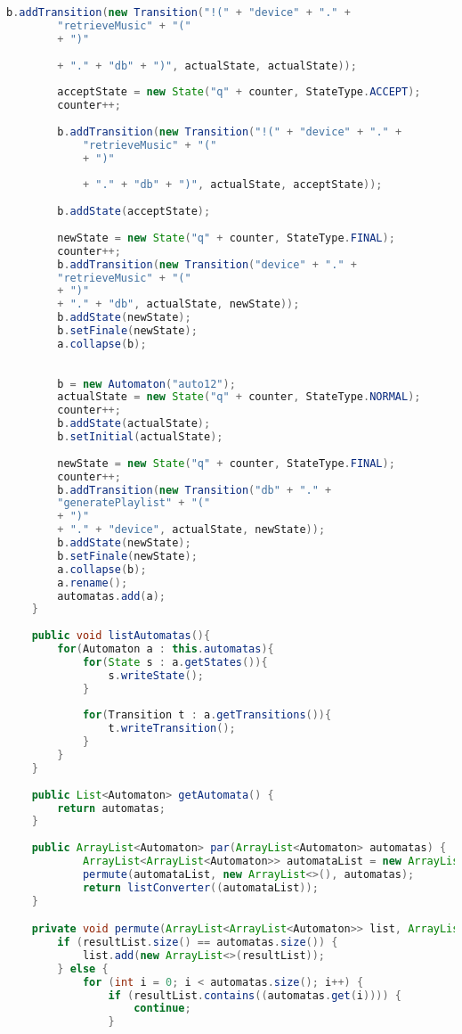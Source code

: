 \begin{lstlisting}[language=java, caption={Specification osztály.},captionpos=b]
		b.addTransition(new Transition("!(" + "device" + "." +
		"retrieveMusic" + "("
		+ ")"
		
		+ "." + "db" + ")", actualState, actualState));
		
		acceptState = new State("q" + counter, StateType.ACCEPT);
		counter++;
		
		b.addTransition(new Transition("!(" + "device" + "." +
			"retrieveMusic" + "("
			+ ")"
			
			+ "." + "db" + ")", actualState, acceptState));
		
		b.addState(acceptState);
		
		newState = new State("q" + counter, StateType.FINAL);
		counter++;
		b.addTransition(new Transition("device" + "." +
		"retrieveMusic" + "("
		+ ")"
		+ "." + "db", actualState, newState));
		b.addState(newState);
		b.setFinale(newState);
		a.collapse(b);
		
		
		b = new Automaton("auto12");
		actualState = new State("q" + counter, StateType.NORMAL);
		counter++;
		b.addState(actualState);
		b.setInitial(actualState);
												
		newState = new State("q" + counter, StateType.FINAL);
		counter++;
		b.addTransition(new Transition("db" + "." +
		"generatePlaylist" + "("
		+ ")"
		+ "." + "device", actualState, newState));
		b.addState(newState);
		b.setFinale(newState);
		a.collapse(b);
		a.rename();
		automatas.add(a);
	}
	
	public void listAutomatas(){
		for(Automaton a : this.automatas){
			for(State s : a.getStates()){
				s.writeState();	
			}
			
			for(Transition t : a.getTransitions()){
				t.writeTransition();
			}
		}
	}
	
	public List<Automaton> getAutomata() {
		return automatas;
	}
	
	public ArrayList<Automaton> par(ArrayList<Automaton> automatas) {
	        ArrayList<ArrayList<Automaton>> automataList = new ArrayList<>();
	        permute(automataList, new ArrayList<>(), automatas);
	        return listConverter((automataList));
	}

    private void permute(ArrayList<ArrayList<Automaton>> list, ArrayList<Automaton> resultList, ArrayList<Automaton> automatas) {
        if (resultList.size() == automatas.size()) {
            list.add(new ArrayList<>(resultList));
        } else {
            for (int i = 0; i < automatas.size(); i++) {
                if (resultList.contains((automatas.get(i)))) {
                    continue;
                }


\end{lstlisting}
